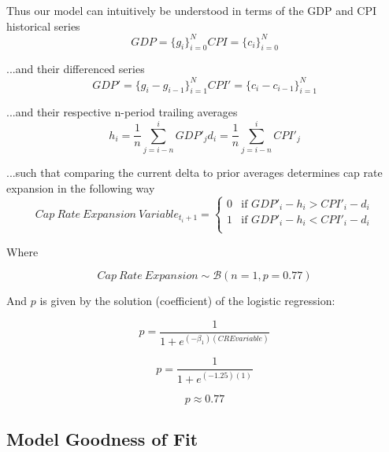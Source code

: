 \pagebreak

Thus our model can intuitively be understood in terms of the GDP and CPI historical series
\begin{equation}
GDP = \{g_i\}_{i=0}^N 
CPI = \{c_i\}_{i=0}^N 
\end{equation}

...and their differenced series
\begin{equation}
GDP' = \{g_i-g_{i-1}\}_{i=1}^N 
CPI' = \{c_i-c_{i-1}\}_{i=1}^N 
\end{equation}

...and their respective n-period trailing averages
\begin{equation}
h_i=\frac{1}{n} \sum_{j=i-n}^{i}GDP'_j
d_i=\frac{1}{n} \sum_{j=i-n}^{i}CPI'_j
\end{equation}

...such that comparing the current delta to prior averages determines cap rate expansion in the following way
\begin{equation}
  Cap\: Rate\:Expansion\:Variable_{t_i+1} =
  \begin{cases}
    0 & \text{if $GDP'_i-h_i > CPI'_i-d_i $} \\
    1 & \text{if $GDP'_i-h_i < CPI'_i-d_i $} \\
  \end{cases}
\end{equation}

Where 

\begin{equation}
  Cap\:Rate\:Expansion \sim \mathcal{B}(n=1,p=0.77)  
\end{equation}

And $p$ is given by the solution (coefficient) of the logistic regression:

\begin{equation}
p=\frac{1}{1+e^{(-\beta_1)(CRE variable)}}
\end{equation}

\begin{equation}
p=\frac{1}{1+e^{(-1.25)(1)}}
\end{equation}

\begin{equation}
p \approx 0.77
\end{equation}

\subsection{Model Goodness of Fit}

